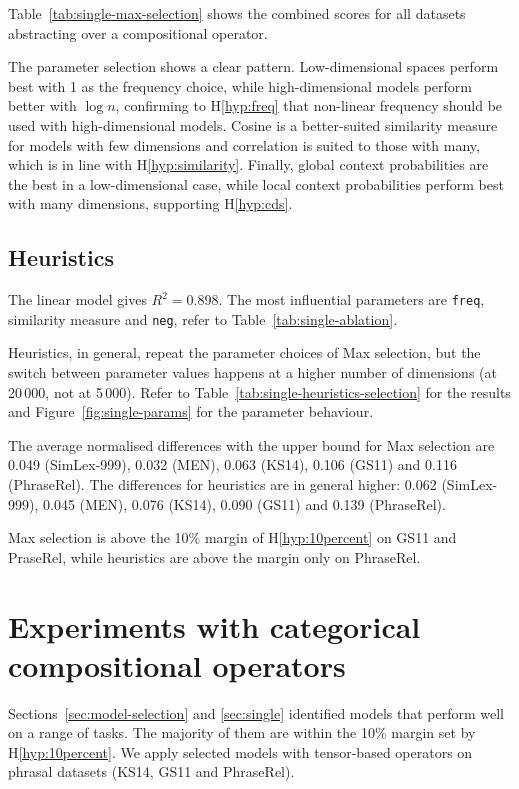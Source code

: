 Table~\ref{tab:single-max-selection} shows the combined scores for all datasets abstracting over a compositional operator.

The parameter selection shows a clear pattern. Low-dimensional spaces perform best with 1 as the frequency choice, while high-dimensional models perform better with $\log n$, confirming to H\ref{hyp:freq} that non-linear frequency should be used with high-dimensional models. Cosine is a better-suited similarity measure for models with few dimensions and correlation is suited to those with many, which is in line with H\ref{hyp:similarity}. Finally, global context probabilities are the best in a low-dimensional case, while local context probabilities perform best with many dimensions, supporting H\ref{hyp:cds}.

\subsection{Heuristics}
\label{sec:heuristics-single}



The linear model gives $R^2 = 0.898$. The most influential parameters are \texttt{freq}, similarity measure and \texttt{neg}, refer to Table~\ref{tab:single-ablation}.

Heuristics, in general, repeat the parameter choices of Max selection, but the switch between parameter values happens at a higher number of dimensions (at 20\,000, not at 5\,000). Refer to Table~\ref{tab:single-heuristics-selection} for the results and Figure~\ref{fig:single-params} for the parameter behaviour.

The average normalised differences with the upper bound for Max selection are 0.049 (SimLex-999), 0.032 (MEN), 0.063 (KS14), 0.106 (GS11) and 0.116 (PhraseRel). The differences for heuristics are in general higher: 0.062 (SimLex-999), 0.045 (MEN), 0.076 (KS14), 0.090 (GS11) and 0.139 (PhraseRel).

Max selection is above the 10\% margin of H\ref{hyp:10percent} on GS11 and PraseRel, while heuristics are above the margin only on PhraseRel.

\section{Experiments with categorical compositional operators}
\label{sec:frob-comp-oper}

Sections~\ref{sec:model-selection} and \ref{sec:single} identified models that perform well on a range of tasks. The majority of them are within the 10\% margin set by H\ref{hyp:10percent}. We apply selected models with tensor-based operators on phrasal datasets (KS14, GS11 and PhraseRel).


